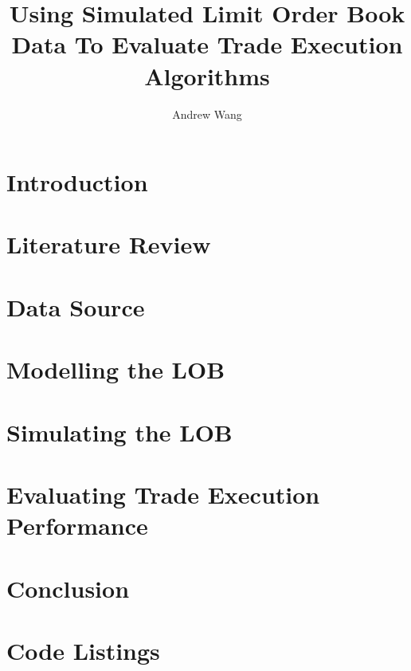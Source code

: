\documentclass[12pt,lot,lol,lof]{puthesis_undergraduate}
\title{Using Simulated Limit Order Book Data To Evaluate Trade Execution Algorithms}
\author{Andrew Wang}
\begin{document}
\chapter{Introduction}\label{ch:intro}


\chapter{Literature Review}\label{ch:litreview}


\chapter{Data Source}\label{ch:data_source}


\chapter{Modelling the LOB}\label{ch:experiment}


\chapter{Simulating the LOB} \label{ch:simulation}


\chapter{Evaluating Trade Execution Performance} \label{ch:trade_execution}


\chapter{Conclusion}


\appendix
\chapter{Code Listings}



 \label{bib}
\end{document}
